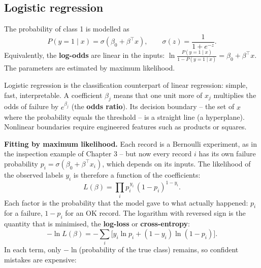 \documentclass[
  letterpaper,
  DIV=11,
  numbers=noendperiod]{scrreprt}
\begin{document}
\subsection{Logistic regression}\label{logistic-regression}

\begin{tcolorbox}[enhanced jigsaw, left=2mm, title=\textcolor{quarto-callout-note-color}{\faInfo}\hspace{0.5em}{Definition: Logistic regression}, opacityback=0, breakable, rightrule=.15mm, arc=.35mm, toptitle=1mm, colbacktitle=quarto-callout-note-color!10!white, opacitybacktitle=0.6, coltitle=black, colframe=quarto-callout-note-color-frame, bottomrule=.15mm, leftrule=.75mm, bottomtitle=1mm, titlerule=0mm, toprule=.15mm, colback=white]

The probability of class 1 is modelled as
\[P(y = 1 \mid x) = \sigma(\beta_0 + \beta^\top x), \qquad \sigma(z) = \frac{1}{1 + e^{-z}}.\]
Equivalently, the \textbf{log-odds} are linear in the inputs:
\(\ln\frac{P(y=1\mid x)}{1 - P(y=1\mid x)} = \beta_0 + \beta^\top x\).
The parameters are estimated by maximum likelihood.

\end{tcolorbox}

Logistic regression is the classification counterpart of linear
regression: simple, fast, interpretable. A coefficient \(\beta_j\) means
that one unit more of \(x_j\) multiplies the odds of failure by
\(e^{\beta_j}\) (the \textbf{odds ratio}). Its decision boundary -- the
set of \(x\) where the probability equals the threshold -- is a straight
line (a hyperplane). Nonlinear boundaries require engineered features
such as products or squares.

\textbf{Fitting by maximum likelihood.} Each record is a Bernoulli
experiment, as in the inspection example of Chapter 3 -- but now every
record \(i\) has its own failure probability
\(p_i = \sigma(\beta_0 + \beta^\top x_i)\), which depends on its inputs.
The likelihood of the observed labels \(y_i\) is therefore a function of
the coefficients:
\[L(\beta) = \prod_i p_i^{\,y_i}\,(1 - p_i)^{1 - y_i}.\] Each factor is
the probability that the model gave to what actually happened: \(p_i\)
for a failure, \(1 - p_i\) for an OK record. The logarithm with reversed
sign is the quantity that is minimised, the \textbf{log-loss} or
\textbf{cross-entropy}:
\[-\ln L(\beta) = -\sum_i \big[y_i \ln p_i + (1 - y_i)\ln(1 - p_i)\big].\]
In each term, only \(-\ln\)(probability of the true class) remains, so
confident mistakes are expensive:
\end{document}

